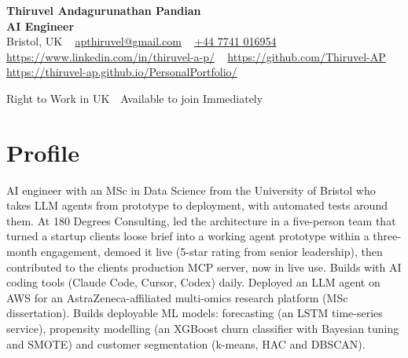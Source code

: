 \documentclass[a4paper,11pt]{article}
\begin{document}
\begin{center}
  {\LARGE\bfseries Thiruvel Andagurunathan Pandian} \\[3pt]
  {\color{headernavy}\small\textbf{AI Engineer}} \\[3pt]
  {\small
  Bristol, UK\nobreak\ \,\textbar\, \href{mailto:apthiruvel@gmail.com}{apthiruvel@gmail.com}\nobreak\ \,\textbar\, \href{tel:+447741016954}{+44 7741 016954}\nobreak\ \,\textbar\, \href{https://www.linkedin.com/in/thiruvel-a-p/}{https://www.linkedin.com/in/thiruvel-a-p/}\nobreak\ \,\textbar\, \href{https://github.com/Thiruvel-AP}{https://github.com/Thiruvel-AP}\nobreak\ \,\textbar\, \href{https://thiruvel-ap.github.io/PersonalPortfolio/}{https://thiruvel-ap.github.io/PersonalPortfolio/}}\par\vspace{4pt}
  \noindent{} Right to Work in UK \,\textbar\, Available to join Immediately
\end{center}

\section{Profile}
AI engineer with an MSc in Data Science from the University of Bristol who takes LLM agents from prototype to deployment, with automated tests around them. At 180 Degrees Consulting, led the architecture in a five-person team that turned a startup client\textquotesingle{}s loose brief into a working agent prototype within a three-month engagement, demoed it live (5-star rating from senior leadership), then contributed to the client\textquotesingle{}s production MCP server, now in live use. Builds with AI coding tools (Claude Code, Cursor, Codex) daily. Deployed an LLM agent on AWS for an AstraZeneca-affiliated multi-omics research platform (MSc dissertation). Builds deployable ML models: forecasting (an LSTM time-series service), propensity modelling (an XGBoost churn classifier with Bayesian tuning and SMOTE) and customer segmentation (k-means, HAC and DBSCAN).
\end{document}
